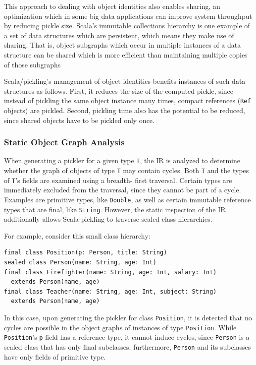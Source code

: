 \documentclass[preprint,10pt]{sigplanconf}
\theoremstyle{definition}
\theoremstyle{definition}
\begin{document}
This approach to dealing with object identities also enables sharing, an
optimization which in some big data applications can improve system throughput
by reducing pickle size. Scala's immutable collections hierarchy is one
example of a set of data structures which are persistent, which means they
make use of sharing. That is, object subgraphs which occur in multiple
instances of a data structure can be shared which is more efficient than
maintaining multiple copies of those subgraphs

Scala/pickling's management of object identities benefits instances of such
data structures as follows. First, it reduces the size of the computed pickle,
since instead of pickling the same object instance many times, compact
references (\verb|Ref| objects) are pickled. Second, pickling time also has
the potential to be reduced, since shared objects have to be pickled only
once.

\subsubsection{Static Object Graph Analysis}
\label{sec:object-graph-analysis}

When generating a pickler for a given type \verb|T|, the IR is analyzed to
determine whether the graph of objects of type \verb|T| may contain cycles.
Both \verb|T| and the types of \verb|T|'s fields are examined using a breadth-
first traversal. Certain types are immediately excluded from the traversal,
since they cannot be part of a cycle. Examples are primitive types, like
\verb|Double|, as well as certain immutable reference types that are final,
like \verb|String|. However, the static inspection of the IR additionally
allows Scala-pickling to traverse sealed class hierarchies.

For example, consider this small class hierarchy:

\begin{lstlisting}
final class Position(p: Person, title: String)
sealed class Person(name: String, age: Int)
final class Firefighter(name: String, age: Int, salary: Int)
  extends Person(name, age)
final class Teacher(name: String, age: Int, subject: String)
  extends Person(name, age)
\end{lstlisting}

In this case, upon generating the pickler for class \verb|Position|, it is
detected that no cycles are possible in the object graphs of instances of type
\verb|Position|. While \verb|Position|'s \verb|p| field has a reference type,
it cannot induce cycles, since \verb|Person| is a sealed class that has only
final subclasses; furthermore, \verb|Person| and its subclasses have only
fields of primitive type.
\end{document}

